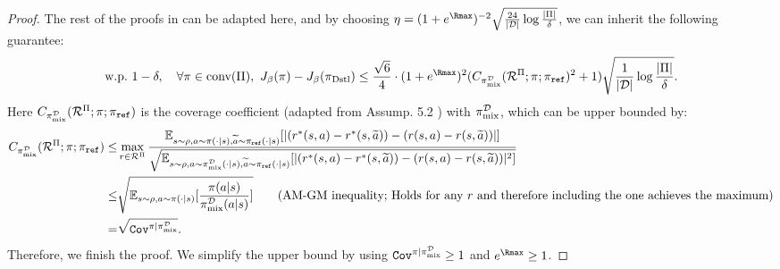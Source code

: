 \begin{proof}
    The rest of the proofs in \citep{liu2024provably} can be adapted here, and by choosing $\eta = (1 + e^{{\Rmax}})^{-2} \sqrt{\frac{24}{|\cD|}\log\frac{|\Pi|}{\delta}}$, we can inherit the following guarantee:
    \begin{align*}
        \text{w.p.}~1-\delta,\quad \forall \pi\in \conv(\Pi),~ J_\beta(\pi) - J_\beta(\pi_\SELF) \leq \frac{\sqrt{6}}{4}\cdot (1+e^{{\Rmax}})^2(C_{\pi_\mix^\cD}(\cR^{\Pi};\pi;\pi_\textref)^2 + 1) \sqrt{\frac{1}{|\cD|} \log\frac{|\Pi|}{\delta}}.
    \end{align*}
    Here $C_{\pi_{\text{mix}}^{\mathcal{D}}}(\mathcal{R}^{\Pi};\pi;\pi_{\texttt{ref}})$ is the coverage coefficient (adapted from Assump. 5.2 \citep{liu2024provably}) with $\pi_{\text{mix}}^{\mathcal{D}}$, which can be upper bounded by:
    \begin{align*}
        C_{\pi_{\text{mix}}^{\mathcal{D}}}(\mathcal{R}^{\Pi};\pi;\pi_{\texttt{ref}}) \leq & \max_{r\in\mathcal{R}^{\Pi}}\frac{\mathbb{E}_{s\sim\rho,a\sim\pi(\cdot|s),\widetilde{a}\sim\pi_{\texttt{ref}}(\cdot|s)}[|(r^*(s,a) - r^*(s,\widetilde{a})) - (r(s,a) - r(s,\widetilde{a}))|]}{\sqrt{\mathbb{E}_{s\sim\rho,a\sim\pi_{\text{mix}}^{\mathcal{D}}(\cdot|s),\widetilde{a}\sim\pi_{\texttt{ref}}(\cdot|s)}[|(r^*(s,a) - r^*(s,\widetilde{a})) - (r(s,a) - r(s,\widetilde{a}))|^2]}} \\
        \leq & \sqrt{\mathbb{E}_{s\sim\rho,a\sim\pi(\cdot|s)}[\frac{\pi(a|s)}{\pi_{\text{mix}}^{\mathcal{D}}(a|s)}]} \tag{AM-GM inequality; Holds for any $r$ and therefore including the one achieves the maximum}\\
        = & \sqrt{{\texttt{Cov}}^{\pi|\pi_{\text{mix}}^{\mathcal{D}}}}.
    \end{align*}
    Therefore, we finish the proof. We simplify the upper bound by using ${\texttt{Cov}}^{\pi|\pi_{\text{mix}}^{\mathcal{D}}} \geq 1$ and $e^{{\Rmax}} \geq 1$.
\end{proof}


